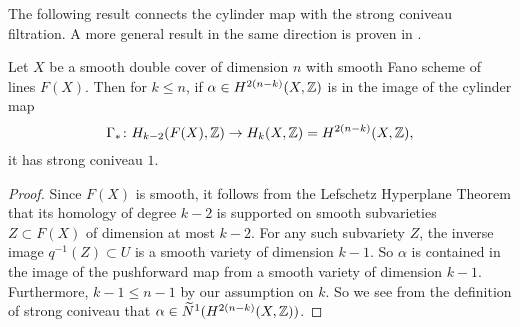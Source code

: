 The following result connects the cylinder map with the strong coniveau filtration. A more general result in the same direction is proven in \cite[Lemma 1.2]{VoisinConiveauThreefolds}.
\begin{lemma}
\label{lem:StrongCylinderConiveauNew}
  Let $X$ be a smooth double cover of dimension $n$ with smooth Fano scheme of lines $F(X)$. Then for $k \leq n$, if $\alpha \in H^{2(n-k)}(X,\mathbb{Z})$ is in the image of the cylinder map
\[\Gamma_* \colon H_{k-2}(F(X),\mathbb{Z}) \to H_{k}(X,\mathbb{Z}) = H^{2(n-k)}(X,\mathbb{Z}),\]
it has strong coniveau $1$.
\end{lemma}
\begin{proof}
  Since $F(X)$ is smooth, it follows from the Lefschetz Hyperplane Theorem that its homology of degree $k-2$ is supported on smooth subvarieties $Z \subset F(X)$ of dimension at most $k-2$. For any such subvariety $Z$, the inverse image $q^{-1}(Z) \subset U$ is a smooth variety of dimension $k-1$. So $\alpha$ is contained in the image of the pushforward map from a smooth variety of dimension $k-1$. Furthermore, $k-1 \leq n-1$ by our assumption on $k$. So we see from the definition of strong coniveau that $\alpha \in \widetilde{N}^1(H^{2(n-k)}(X,\mathbb{Z}))$.
\end{proof}




